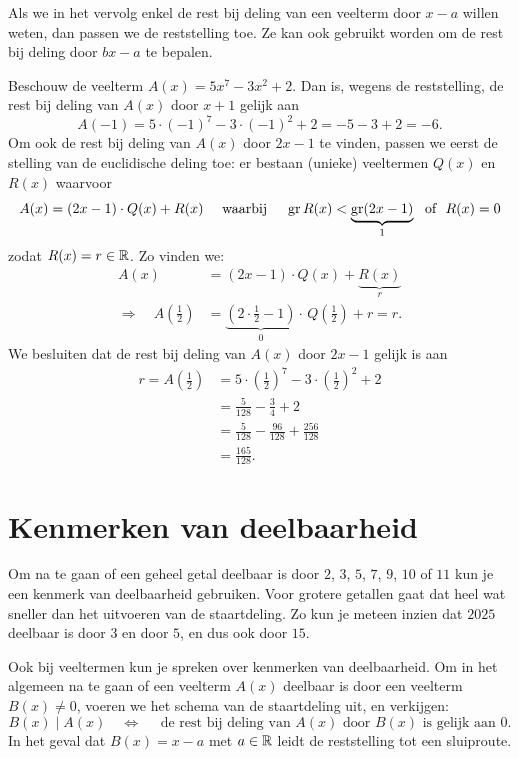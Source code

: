 \documentclass{ximera}
\begin{document}
Als we in het vervolg enkel de rest bij deling van een veelterm door $x-a$ willen weten, dan passen we de reststelling toe. Ze kan ook gebruikt worden om de rest bij deling door $bx-a$ te bepalen. 

\begin{example} 
Beschouw de veelterm $A(x) = 5x^7 - 3x^2 + 2$. Dan is, wegens de reststelling, de rest bij deling van $A(x)$ door $x+1$ gelijk aan
\[
A(-1) = 5 \cdot (-1)^7 - 3 \cdot (-1)^2 + 2 = -5-3+2 = -6.
\]
Om ook de rest bij deling van $A(x)$ door $2x-1$ te vinden, passen we eerst de stelling van de euclidische deling toe: er bestaan (unieke) veeltermen $Q(x)$ en $R(x)$ waarvoor
\[
A(x) = (2x-1)\cdot Q(x) + R(x) \quad \text{ waarbij } \quad \operatorname{gr} R(x) < \underbrace{\operatorname{gr} (2x-1)}_{1} \,\, \text{ of } \,\, R(x) = 0
\]
zodat $R(x) = r \in \mathbb{R}$. Zo vinden we:
\begin{align*}
A(x) & = (2x-1) \cdot Q(x) + \underbrace{R(x)}_{r} \\
\Rightarrow \quad A\left(\frac{1}{2}\right) & = \underbrace{\left(2 \cdot \frac{1}{2}-1\right)}_{0} \cdot \,Q\left(\frac{1}{2}\right) + r = r. 
\end{align*} 
We besluiten dat de rest bij deling van $A(x)$ door $2x-1$ gelijk is aan
\begin{align*}
r = A\left(\frac{1}{2}\right) & = 5 \cdot \left(\frac{1}{2}\right)^7 - 3 \cdot \left(\frac{1}{2}\right)^2 + 2 \\
& = \frac{5}{128} - \frac{3}{4} + 2 \\
& = \frac{5}{128} - \frac{96}{128} + \frac{256}{128} \\
& = \frac{165}{128}.
\end{align*}
\end{example} 

\section{Kenmerken van deelbaarheid} 

Om na te gaan of een geheel getal deelbaar is door $2$, $3$, $5$, $7$, $9$, $10$ of $11$ kun je een kenmerk van deelbaarheid gebruiken. Voor grotere getallen gaat dat heel wat sneller dan het uitvoeren van de staartdeling. Zo kun je meteen inzien dat $2025$ deelbaar is door $3$ en door $5$, en dus ook door $15$.  

Ook bij veeltermen kun je spreken over kenmerken van deelbaarheid. Om in het algemeen na te gaan of een veelterm $A(x)$ deelbaar is door een veelterm $B(x) \neq 0$, voeren we het schema van de staartdeling uit, en verkijgen:
\[
B(x) \mid A(x) \quad \Leftrightarrow \quad \text{ de rest bij deling van $A(x)$ door $B(x)$ is gelijk aan $0$.}
\] 
In het geval dat $B(x) = x-a$ met $a \in \mathbb{R}$ leidt de reststelling tot een sluiproute.
\end{document}
